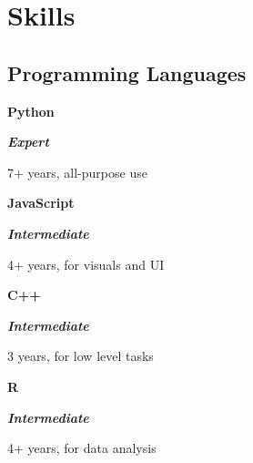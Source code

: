 \section{Skills}

\begin{multicols}{2}
\newcommand{\skill}[3]{
\parbox{0.02 \linewidth}{\hfill}
\parbox{0.19 \linewidth}{\textbf{#1}}
\parbox{0.24\linewidth}{\textit{#2}}
\parbox[t]{0.54\linewidth}{#3}
}



\newcommand{\skillplus}[4]{
\parbox{0.02 \linewidth}{\hfill}
\parbox{0.19 \linewidth}{\textbf{#1}}
\parbox{0.24\linewidth}{#2}
\parbox[t]{0.54\linewidth}{#3}
\\
\parbox[t]{0.05\linewidth}{\hfill}\parbox[t]{0.95\linewidth}{#4}
}


\subsection{Programming Languages}

\newcommand{\expert}{\textbf{\color{expert} Expert} }

\newcommand{\advanced}{\textbf{\color{advanced} Advanced} }

\newcommand{\intermediate}{\textbf{\color{intermediate} Intermediate} }

\newcommand{\proficient}{\textbf{\color{proficient} Proficient} }

\skill{Python}{\expert{}}{7+ years, all-purpose use}%


\skill{JavaScript}{\intermediate{}}{4+ years, for visuals and UI}%

\skill{C++}{\intermediate{}}{3 years, for low level tasks}%

\skill{R}{\intermediate{}}{4+ years, for data analysis}


\end{multicols}
